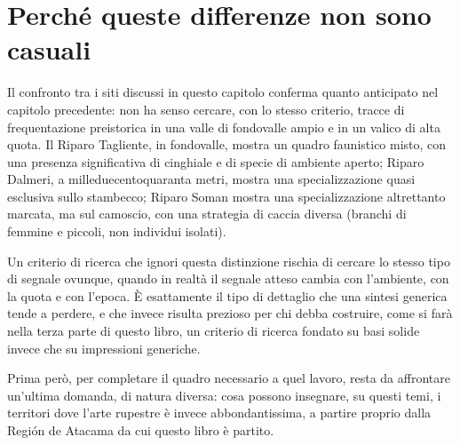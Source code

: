 \section{Perché queste differenze non sono casuali}

Il confronto tra i siti discussi in questo capitolo conferma quanto anticipato nel capitolo precedente: non ha senso cercare, con lo stesso criterio, tracce di frequentazione preistorica in una valle di fondovalle ampio e in un valico di alta quota. Il Riparo Tagliente, in fondovalle, mostra un quadro faunistico misto, con una presenza significativa di cinghiale e di specie di ambiente aperto; Riparo Dalmeri, a milleduecentoquaranta metri, mostra una specializzazione quasi esclusiva sullo stambecco; Riparo Soman mostra una specializzazione altrettanto marcata, ma sul camoscio, con una strategia di caccia diversa (branchi di femmine e piccoli, non individui isolati).

Un criterio di ricerca che ignori questa distinzione rischia di cercare lo stesso tipo di segnale ovunque, quando in realtà il segnale atteso cambia con l'ambiente, con la quota e con l'epoca. È esattamente il tipo di dettaglio che una sintesi generica tende a perdere, e che invece risulta prezioso per chi debba costruire, come si farà nella terza parte di questo libro, un criterio di ricerca fondato su basi solide invece che su impressioni generiche.

Prima però, per completare il quadro necessario a quel lavoro, resta da affrontare un'ultima domanda, di natura diversa: cosa possono insegnare, su questi temi, i territori dove l'arte rupestre è invece abbondantissima, a partire proprio dalla Región de Atacama da cui questo libro è partito.
